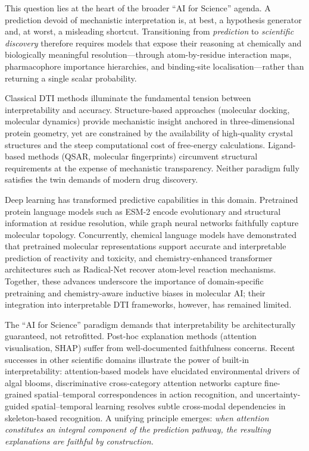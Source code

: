 \documentclass[fleqn,10pt]{wlscirep}
\begin{document}
This question lies at the heart of the broader ``AI for Science'' agenda.  A
prediction devoid of mechanistic interpretation is, at best, a hypothesis
generator and, at worst, a misleading shortcut.  Transitioning from
\emph{prediction} to \emph{scientific discovery} therefore requires models
that expose their reasoning at chemically and biologically meaningful
resolution---through atom-by-residue interaction maps, pharmacophore importance
hierarchies, and binding-site localisation---rather than returning a single
scalar probability.

Classical DTI methods illuminate the fundamental tension between interpretability
and accuracy.  Structure-based approaches (molecular docking, molecular dynamics)
provide mechanistic insight anchored in three-dimensional protein
geometry,\cite{kitchen2004docking} yet are constrained by the availability of
high-quality crystal structures and the steep computational cost of free-energy
calculations.  Ligand-based methods (QSAR, molecular
fingerprints)\cite{cherkasov2014qsar} circumvent structural requirements at
the expense of mechanistic transparency.  Neither paradigm fully satisfies the
twin demands of modern drug discovery.

Deep learning has transformed predictive capabilities in this domain.
Pretrained protein language models such as ESM-2\cite{lin2023evolutionary}
encode evolutionary and structural information at residue resolution, while
graph neural networks faithfully capture molecular topology.  Concurrently,
chemical language models have demonstrated that pretrained molecular
representations support accurate and interpretable prediction of reactivity and
toxicity,\cite{huang2025large} and chemistry-enhanced transformer
architectures such as Radical-Net recover atom-level reaction
mechanisms.\cite{huang2025radical}  Together, these advances underscore
the importance of domain-specific pretraining and chemistry-aware inductive
biases in molecular AI;\cite{huang2024ai} their integration into
interpretable DTI frameworks, however, has remained limited.

The ``AI for Science'' paradigm demands that interpretability be architecturally
guaranteed, not retrofitted.  Post-hoc explanation methods (attention
visualisation, SHAP) suffer from well-documented faithfulness
concerns.\cite{jain2019attention}  Recent successes in other scientific
domains illustrate the power of built-in interpretability: attention-based
models have elucidated environmental drivers of algal
blooms,\cite{huang2025unveiling} discriminative cross-category attention
networks capture fine-grained spatial--temporal correspondences in action
recognition,\cite{wu2026cross} and uncertainty-guided spatial--temporal
learning resolves subtle cross-modal dependencies in skeleton-based
recognition.\cite{wu2025leveraging}  A unifying principle emerges:
\emph{when attention constitutes an integral component of the prediction pathway,
the resulting explanations are faithful by construction.}
\end{document}
